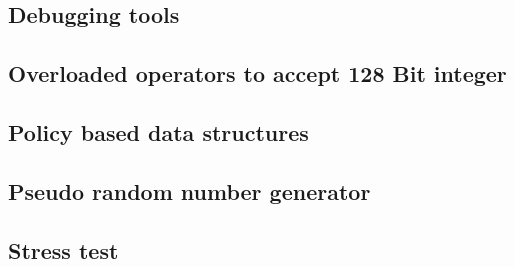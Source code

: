 \subsection{Debugging tools}
\raggedbottom
\hrulefill
\subsection{Overloaded operators to accept 128 Bit integer}
\raggedbottom
\hrulefill
\subsection{Policy based data structures}
\raggedbottom
\hrulefill
\subsection{Pseudo random number generator}
\raggedbottom
\hrulefill
\subsection{Stress test}
\raggedbottom
\hrulefill
